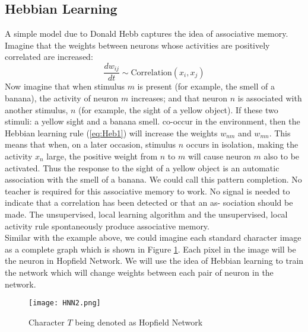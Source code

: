 \subsection{Hebbian Learning}
A simple model due to Donald Hebb captures the idea of associative memory. Imagine that the weights between neurons whose activities are positively correlated are increased:
\begin{equation}
	\label{eq:Heb1}
	\frac{dw_{ij}}{dt} \sim \text{Correlation}(x_i, x_j)
  \end{equation}
  Now imagine that when stimulus $m$ is present (for example, the smell of a banana), the activity of neuron $m$ increases; and that neuron $n$ is associated with another stimulus, $n$ (for example, the sight of a yellow object). If these two stimuli: a yellow sight and a banana smell. co-occur in the environment, then the Hebbian learning rule (\ref{eq:Heb1}) will increase the weights $w_{nm}$ and $w_{mn}$. This means that when, on a later occasion, stimulus $n$ occurs in isolation, making the activity $x_n$ large, the positive weight from $n$ to $m$ will cause neuron $m$ also to be activated. Thus the response to the sight of a yellow object is an automatic association with the smell of a banana. We could call this pattern completion. No teacher is required for this associative memory to work. No signal is needed to indicate that a correlation has been detected or that an as- sociation should be made. The unsupervised, local learning algorithm and the unsupervised, local activity rule spontaneously produce associative memory.\\

  Similar with the example above, we could imagine each standard character image as a complete graph which is shown in Figure \ref{fg:HNN2}. Each pixel in the image will be the neuron in Hopfield Network. We will use the idea of Hebbian learning to train the network which will change weights between each pair of neuron in the network.\\
  \begin{figure}[h]
  \centering
  \texttt{[image: HNN2.png]}
  \caption{Character $T$ being denoted as Hopfield Network}
  \label{fg:HNN2}
  \end{figure}

